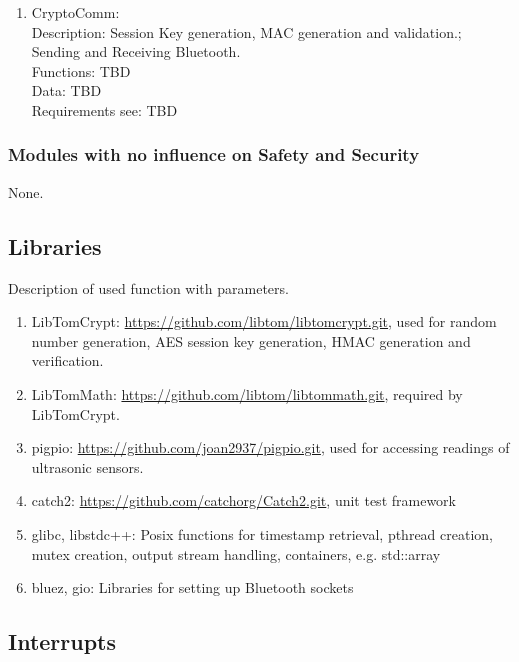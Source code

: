\begin{enumerate}
	\item CryptoComm: \\
		Description: Session Key generation, MAC generation and validation.; Sending and Receiving Bluetooth.\\
		Functions: TBD\\
		Data: TBD\\
		Requirements see: TBD\\
\end{enumerate}

\subsubsection{Modules with no influence on Safety and Security}

None.

\subsection{Libraries}

Description of used function with parameters.

\begin{enumerate}
	\item LibTomCrypt: \href{https://github.com/libtom/libtomcrypt.git} {https://github.com/libtom/libtomcrypt.git}, used for random number generation, AES session key generation, HMAC generation and verification.
	\item LibTomMath: \href{https://github.com/libtom/libtommath.git} {https://github.com/libtom/libtommath.git}, required by LibTomCrypt.
	\item pigpio: \href{https://github.com/joan2937/pigpio.git} {https://github.com/joan2937/pigpio.git}, used for accessing readings of ultrasonic sensors.
	\item catch2: \href{https://github.com/catchorg/Catch2.git} {https://github.com/catchorg/Catch2.git}, unit test framework
	\item glibc, libstdc++: Posix functions for timestamp retrieval, pthread creation, mutex creation, output stream handling, containers, e.g. std::array
	\item bluez, gio: Libraries for setting up Bluetooth sockets
\end{enumerate}

\subsection{Interrupts}


